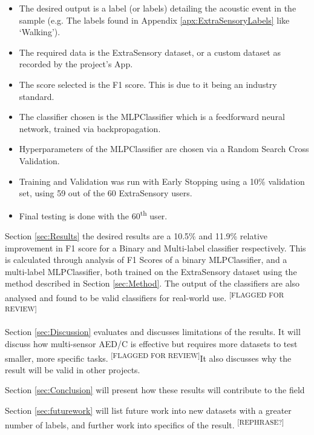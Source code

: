 \documentclass{UoNMCHA}
\newcommand{\flagforreview}{\textsuperscript{\color{red} [FLAGGED FOR REVIEW]}}
\newcommand{\rephrase}{\textsuperscript{\color{red} [REPHRASE?]}}
\newcommand{\sref}[1] {Section \ref{#1}}
\newcommand{\aref}[1] {Appendix \ref{#1}}
\numberwithin{equation}{section}
\begin{document}
{\small
\begin{itemize}
    \item The desired output is a label (or labels) detailing the acoustic event in the sample (e.g. The labels found in \aref{apx:ExtraSensoryLabels} like `Walking').
    \item The required data is the ExtraSensory dataset, or a custom dataset as recorded by the project's App.
    \item The score selected is the F1 score. This is due to it being an industry standard.
    \item The classifier chosen is the MLPClassifier which is a feedforward neural network, trained via backpropagation.
    \item Hyperparameters of the MLPClassifier are chosen via a Random Search Cross Validation.
    \item Training and Validation was run with Early Stopping using a 10\% validation set, using 59 out of the 60 ExtraSensory users.
    \item Final testing is done with the 60\textsuperscript{th} user.
\end{itemize}

\sref{sec:Results} the desired results are a 10.5\% and 11.9\% relative improvement in F1 score for a Binary and Multi-label classifier respectively. This is calculated through analysis of F1 Scores of a binary MLPClassifier, and a multi-label MLPClassifier, both trained on the ExtraSensory dataset using the method described in \sref{sec:Method}. The output of the classifiers are also analysed and found to be valid classifiers for real-world use. \flagforreview

\sref{sec:Discussion} evaluates and discusses limitations of the results. It will discuss how multi-sensor AED/C is effective but requires more datasets to test smaller, more specific tasks. \flagforreview It also discusses why the result will be valid in other projects.

\sref{sec:Conclusion} will present how these results will contribute to the field

\sref{sec:futurework} will list future work into new datasets with a greater number of labels, and further work into specifics of the result. \rephrase
\newpage
\vspace{-2mm}
}
\end{document}

